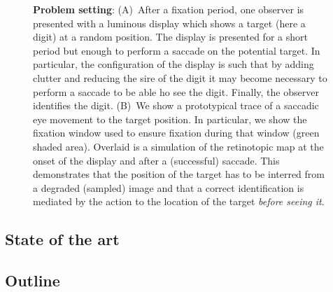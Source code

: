  
\begin{figure}%
\caption{
{\bf Problem setting}:
(A)~After a fixation period, one observer is presented with a luminous display which shows a target (here a digit) at a random position. The display is presented for a short period but enough to perform a saccade on the potential target. In particular, the configuration of the display is such that by adding clutter and reducing the sire of the digit it may become necessary to perform a saccade to be able ho see the digit. Finally, the observer identifies the digit. 
(B)~We show a prototypical trace of a saccadic eye movement to the target position. In particular, we show the fixation window used to ensure fixation during that window (green shaded area). Overlaid is a simulation of the retinotopic map at the onset of the display and after a (successful) saccade. This demonstrates that the position of the target has to be interred from a degraded (sampled) image and that a correct identification is mediated by the action to the location of the target \emph{before seeing it}.
\label{fig:map}}%
\end{figure}%

 
 
 
 
\subsection{State of the art}

\subsection{Outline}

